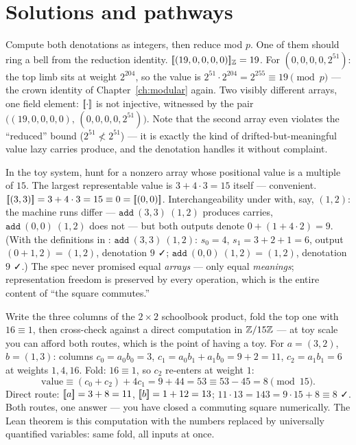 \section*{Solutions and pathways}
\solutionsintro

\pathway Compute both denotations as integers, then reduce mod $p$. One of
them should ring a bell from the reduction identity.
\answer $[\mkern-3.3mu[ (19,0,0,0,0) ]\mkern-3.3mu]_{\mathbb{Z}} = 19$. For $(0,0,0,0,2^{51})$: the
top limb sits at weight $2^{204}$, so the value is
$2^{51} \cdot 2^{204} = 2^{255} \equiv 19 \pmod p$ --- the crown identity
of Chapter~\ref{ch:modular} again. Two visibly different arrays, one
field element: $[\mkern-3.3mu[ \cdot ]\mkern-3.3mu]$ is not injective, witnessed by the pair
$\big((19,0,0,0,0),\, (0,0,0,0,2^{51})\big)$. Note that the second array
even violates the ``reduced'' bound ($2^{51} \not< 2^{51}$) --- it is
exactly the kind of drifted-but-meaningful value lazy carries produce,
and the denotation handles it without complaint.

\pathway In the toy system, hunt for a nonzero array whose positional
value is a multiple of $15$. The largest representable value is
$3 + 4\cdot 3 = 15$ itself --- convenient.
\answer $[\mkern-3.3mu[ (3,3) ]\mkern-3.3mu] = 3 + 4 \cdot 3 = 15 \equiv 0 = [\mkern-3.3mu[ (0,0) ]\mkern-3.3mu]$.
Interchangeability under  with, say, $(1,2)$: the machine runs
differ --- $\mathtt{add}\ (3,3)\ (1,2)$ produces carries, $\mathtt{add}\
(0,0)\ (1,2)$ does not --- but both outputs denote
$0 + (1 + 4\cdot 2) = 9$. (With the definitions in
: $\mathtt{add}\ (3,3)\ (1,2)$: $s_0 = 4$,
$s_1 = 3 + 2 + 1 = 6$, output $(0 + 1, 2) = (1,2)$, denotation $9$ ✓;
$\mathtt{add}\ (0,0)\ (1,2) = (1,2)$, denotation $9$ ✓.) The spec never
promised equal \emph{arrays} --- only equal \emph{meanings}; representation
freedom is preserved by every operation, which is the entire content of
``the square commutes.''

\pathway Write the three columns of the $2\times 2$ schoolbook product,
fold the top one with $16 \equiv 1$, then cross-check against a direct
computation in $\mathbb{Z}/15\mathbb{Z}$ --- at toy scale you can afford both routes,
which is the point of having a toy.
\answer For $a = (3,2)$, $b = (1,3)$: columns
$c_0 = a_0 b_0 = 3$, $c_1 = a_0 b_1 + a_1 b_0 = 9 + 2 = 11$,
$c_2 = a_1 b_1 = 6$ at weights $1, 4, 16$. Fold: $16 \equiv 1$, so $c_2$
re-enters at weight $1$:
\[
\text{value} \equiv (c_0 + c_2) + 4 c_1 = 9 + 44 = 53 \equiv 53 - 45 = 8
\pmod{15}.
\]
Direct route: $[\mkern-3.3mu[ a ]\mkern-3.3mu] = 3 + 8 = 11$, $[\mkern-3.3mu[ b ]\mkern-3.3mu] = 1 + 12 = 13$;
$11 \cdot 13 = 143 = 9 \cdot 15 + 8 \equiv 8$ ✓. Both routes, one
answer --- you have closed a commuting square numerically. The Lean
theorem \lean{mulVal_spec} is this computation with the numbers replaced
by universally quantified variables: same fold, all inputs at once.

